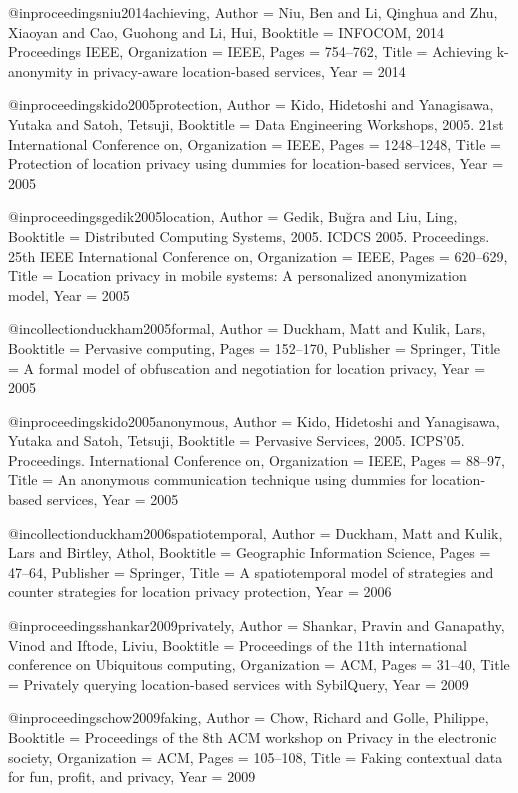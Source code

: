 {{@inproceedings{niu2014achieving,
	Author = {Niu, Ben and Li, Qinghua and Zhu, Xiaoyan and Cao, Guohong and Li, Hui},
	Booktitle = {INFOCOM, 2014 Proceedings IEEE},
	Organization = {IEEE},
	Pages = {754--762},
	Title = {Achieving k-anonymity in privacy-aware location-based services},
	Year = {2014}}



@inproceedings{kido2005protection,
	Author = {Kido, Hidetoshi and Yanagisawa, Yutaka and Satoh, Tetsuji},
	Booktitle = {Data Engineering Workshops, 2005. 21st International Conference on},
	Organization = {IEEE},
	Pages = {1248--1248},
	Title = {Protection of location privacy using dummies for location-based services},
	Year = {2005}}

@inproceedings{gedik2005location,
	Author = {Gedik, Bu{\u{g}}ra and Liu, Ling},
	Booktitle = {Distributed Computing Systems, 2005. ICDCS 2005. Proceedings. 25th IEEE International Conference on},
	Organization = {IEEE},
	Pages = {620--629},
	Title = {Location privacy in mobile systems: A personalized anonymization model},
	Year = {2005}}


@incollection{duckham2005formal,
	Author = {Duckham, Matt and Kulik, Lars},
	Booktitle = {Pervasive computing},
	Pages = {152--170},
	Publisher = {Springer},
	Title = {A formal model of obfuscation and negotiation for location privacy},
	Year = {2005}}

@inproceedings{kido2005anonymous,
	Author = {Kido, Hidetoshi and Yanagisawa, Yutaka and Satoh, Tetsuji},
	Booktitle = {Pervasive Services, 2005. ICPS'05. Proceedings. International Conference on},
	Organization = {IEEE},
	Pages = {88--97},
	Title = {An anonymous communication technique using dummies for location-based services},
	Year = {2005}}

@incollection{duckham2006spatiotemporal,
	Author = {Duckham, Matt and Kulik, Lars and Birtley, Athol},
	Booktitle = {Geographic Information Science},
	Pages = {47--64},
	Publisher = {Springer},
	Title = {A spatiotemporal model of strategies and counter strategies for location privacy protection},
	Year = {2006}}

@inproceedings{shankar2009privately,
	Author = {Shankar, Pravin and Ganapathy, Vinod and Iftode, Liviu},
	Booktitle = {Proceedings of the 11th international conference on Ubiquitous computing},
	Organization = {ACM},
	Pages = {31--40},
	Title = {Privately querying location-based services with SybilQuery},
	Year = {2009}}

@inproceedings{chow2009faking,
	Author = {Chow, Richard and Golle, Philippe},
	Booktitle = {Proceedings of the 8th ACM workshop on Privacy in the electronic society},
	Organization = {ACM},
	Pages = {105--108},
	Title = {Faking contextual data for fun, profit, and privacy},
	Year = {2009}}

}}
